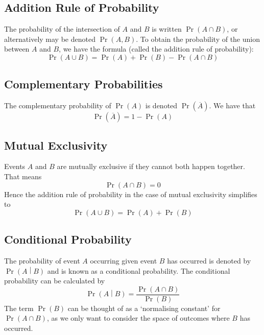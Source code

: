 \documentclass[11pt]{report} %
\begin{document}
\subsection{Addition Rule of Probability}

The probability of the intersection of $A$ and $B$ is written $\operatorname{Pr}\left(A \cap B\right)$, or alternatively may be denoted $\operatorname{Pr}\left(A, B\right)$. To obtain the probability of the union between $A$ and $B$, we have the formula (called the addition rule of probability):
\begin{equation}
\operatorname{Pr}\left(A \cup B\right) = \operatorname{Pr}\left(A\right) + \operatorname{Pr}\left( B\right) - \operatorname{Pr}\left(A \cap B\right) 
\end{equation}

\subsection{Complementary Probabilities}

The complementary probability of $\operatorname{Pr}\left(A\right)$ is denoted $\operatorname{Pr}\left(\overline{A}\right)$. We have that
\begin{equation}
\operatorname{Pr}\left(\overline{A}\right) = 1 - \operatorname{Pr}\left(A\right)
\end{equation}

\subsection{Mutual Exclusivity}

Events $A$ and $B$ are mutually exclusive if they cannot both happen together. That means
\begin{equation}
\operatorname{Pr}\left(A \cap B \right) = 0
\end{equation}
Hence the addition rule of probability in the case of mutual exclusivity simplifies to
\begin{equation}
\operatorname{Pr}\left(A \cup B\right) = \operatorname{Pr}\left(A\right) + \operatorname{Pr}\left( B\right)
\end{equation}

\subsection{Conditional Probability}

The probability of event $A$ occurring given event $B$ has occurred is denoted by $\operatorname{Pr}\left(A\middle|B\right)$ and is known as a conditional probability. The conditional probability can be calculated by
\begin{equation}
\operatorname{Pr}\left(A\middle|B\right) = \dfrac{\operatorname{Pr}\left(A \cap B\right)}{\operatorname{Pr}\left(B\right)}
\end{equation}
The term $\operatorname{Pr}\left(B\right)$ can be thought of as a `normalising constant' for $\operatorname{Pr}\left(A \cap B\right)$, as we only want to consider the space of outcomes where $B$ has occurred.
\end{document}
